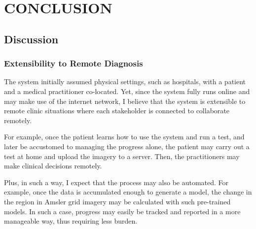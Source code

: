 \chapter{CONCLUSION}

\section{Discussion}

\begin{comment}
\subsection{Feedback from the Medical Practitioner}

Mus mauris vitae ultricies leo integer malesuada nunc. Eget nullam non nisi est sit amet. Tristique magna sit amet purus gravida quis. Interdum posuere lorem ipsum dolor sit amet. Vestibulum morbi blandit cursus risus at. Sapien pellentesque habitant morbi tristique senectus et. Etiam tempor orci eu lobortis. Orci sagittis eu volutpat odio facilisis mauris. Tempus egestas sed sed risus pretium quam. Mi sit amet mauris commodo. Nibh cras pulvinar mattis nunc sed. Nec dui nunc mattis enim ut tellus elementum sagittis vitae. Mi tempus imperdiet nulla malesuada pellentesque elit eget. Molestie at elementum eu facilisis sed odio. Ut aliquam purus sit amet luctus venenatis lectus magna fringilla. Id donec ultrices tincidunt arcu non sodales neque sodales.

\end{comment}

\subsection{Extensibility to Remote Diagnosis}

The system initially assumed physical settings, such as hospitals, with a patient and a medical practitioner co-located. Yet, since the system fully runs online and may make use of the internet network, I believe that the system is extensible to remote clinic situations where each stakeholder is connected to collaborate remotely.

For example, once the patient learns how to use the system and run a test, and later be accustomed to managing the progress alone, the patient may carry out a test at home and upload the imagery to a server. Then, the practitioners may make clinical decisions remotely.

Plus, in such a way, I expect that the process may also be automated. For example, once the data is accumulated enough to generate a model, the change in the region in Amsler grid imagery may be calculated with such pre-trained models. In such a case, progress may easily be tracked and reported in a more manageable way, thus requiring less burden.

